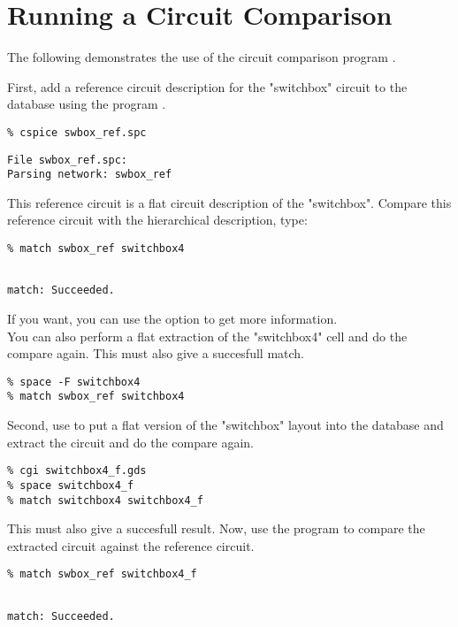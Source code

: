\section{Running a Circuit Comparison}
The following demonstrates the use of the circuit comparison program .

First, add a reference circuit description for the "switchbox" circuit
to the database using the program .
\small
\begin{Verbatim}
% cspice swbox_ref.spc
\end{Verbatim}
\normalsize
\small \begin{Verbatim}[frame=single]
File swbox_ref.spc:
Parsing network: swbox_ref
\end{Verbatim}
\normalsize
This reference circuit is a flat circuit description of the "switchbox".
Compare this reference circuit with the hierarchical description, type:
\small
\begin{Verbatim}
% match swbox_ref switchbox4
\end{Verbatim}
\normalsize
\small \begin{Verbatim}[frame=single]

match: Succeeded.

\end{Verbatim}
\normalsize
If you want, you can use the  option to get more information.
\\[1 ex]
You can also perform a flat extraction of the "switchbox4" cell and do the compare again.
This must also give a succesfull match.
\small
\begin{Verbatim}
% space -F switchbox4
% match swbox_ref switchbox4
\end{Verbatim}
\normalsize
Second, use  to put a flat version of the "switchbox" layout into the
database and extract the circuit and do the compare again.
\small
\begin{Verbatim}
% cgi switchbox4_f.gds
% space switchbox4_f
% match switchbox4 switchbox4_f
\end{Verbatim}
\normalsize
This must also give a succesfull  result.
Now, use the program  to compare the extracted circuit against the
reference circuit.
\small
\begin{Verbatim}
% match swbox_ref switchbox4_f
\end{Verbatim}
\normalsize
\small \begin{Verbatim}[frame=single]

match: Succeeded.

\end{Verbatim}
